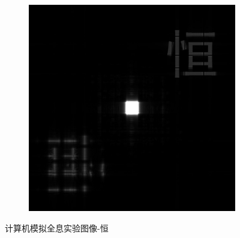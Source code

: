\documentclass{ctexart}
\begin{document}
\begin{figure}[H]
\begin{subfigure}{.32\textwidth}
  \end{subfigure}
  \begin{subfigure}{.32\textwidth}
    \includegraphics[width=\linewidth]{数字全息实验数据/计算机模拟全息/用软件重建的结果图像/4-恒-重建.jpg}
  \end{subfigure}
  \caption{计算机模拟全息实验图像-恒}
\end{figure}
\end{document}
